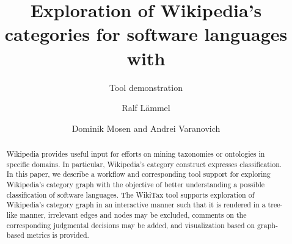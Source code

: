 \documentclass[a4paper,runningheads]{myllncs}
\author{Ralf L\"ammel \and Dominik Mosen and Andrei Varanovich}
\institute{University of Koblenz-Landau, Software Languages Team}
\title{Exploration of Wikipedia's categories for software languages
  with \WikiTax}
\subtitle{Tool demonstration}
\newcommand{\Wikipedia}{\textsf{Wikipedia}}
\newcommand{\WikiTax}{\textsf{WikiTax}}
\begin{document}
\maketitle

\begin{abstract} 

  \Wikipedia{} provides useful input for efforts on mining taxonomies
  or ontologies in specific domains. In particular, \Wikipedia's
  category construct expresses classification. In this paper, we
  describe a workflow and corresponding tool support for exploring
  \Wikipedia's category graph with the objective of better
  understanding a possible classification of software languages. The
  \WikiTax{} tool supports exploration of \Wikipedia's category graph
  in an interactive manner such that it is rendered in a tree-like
  manner, irrelevant edges and nodes may be excluded, comments on the
  corresponding judgmental decisions may be added, and visualization
  based on graph-based metrics is provided.

\end{abstract}











\end{document}
